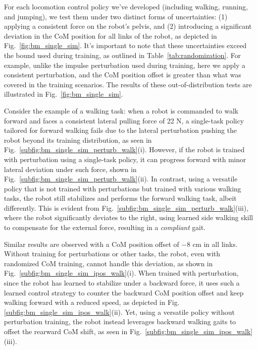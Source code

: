 For each locomotion control policy we've developed (including walking, running, and jumping), we test them under two distinct forms of uncertainties: (1) applying a consistent force on the robot's pelvis, and (2) introducing a significant deviation in the CoM position for all links of the robot, as depicted in Fig.~\ref{fig:bm_single_sim}. 
It's important to note that these uncertainties exceed the bound used during training, as outlined in Table~\ref{tab:randomization}. 
For example, unlike the impulse perturbation used during training, here we apply a consistent perturbation, and the CoM position offset is greater than what was covered in the training scenarios. 
The results of these out-of-distribution tests are illustrated in Fig.~\ref{fig:bm_single_sim}.


Consider the example of a walking task: when a robot is commanded to walk forward and faces a consistent lateral pulling force of 22 N, a single-task policy tailored for forward walking fails due to the lateral perturbation pushing the robot beyond its training distribution, as seen in Fig.~\ref{subfig:bm_single_sim_perturb_walk}(i). 
However, if the robot is trained with perturbation using a single-task policy, it can progress forward with minor lateral deviation under such force, shown in Fig.~\ref{subfig:bm_single_sim_perturb_walk}(ii).
In contrast, using a versatile policy that is not trained with perturbations but trained with various walking tasks, the robot still stabilizes and performs the forward walking task, albeit differently. 
This is evident from Fig.~\ref{subfig:bm_single_sim_perturb_walk}(iii), where the robot significantly deviates to the right, using learned side walking skill to compensate for the external force, resulting in a \emph{compliant} gait.

Similar results are observed with a CoM position offset of $-8$ cm in all links. Without training for perturbations or other tasks, the robot, even with randomized CoM training, cannot handle this deviation, as shown in Fig.~\ref{subfig:bm_single_sim_ipos_walk}(i). 
When trained with perturbation, since the robot has learned to stabilize under a backward force, it uses such a learned control strategy to counter the backward CoM position offset and keep walking forward with a reduced speed, as depicted in Fig.\ref{subfig:bm_single_sim_ipos_walk}(ii). 
Yet, using a versatile policy without perturbation training, the robot instead leverages backward walking gaits to offset the rearward CoM shift, as seen in Fig.~\ref{subfig:bm_single_sim_ipos_walk}(iii).




